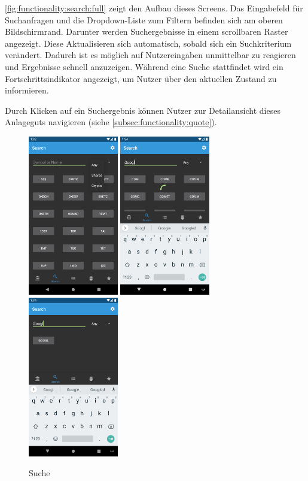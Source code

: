 \documentclass[a4paper]{article}
\begin{document}
\autoref{fig:functionality:search:full} zeigt den Aufbau dieses Screens.
Das Eingabefeld für Suchanfragen und die Dropdown-Liste zum Filtern befinden sich am oberen Bildschirmrand.
Darunter werden Suchergebnisse in einem scrollbaren Raster angezeigt.
Diese Aktualisieren sich automatisch, sobald sich ein Suchkriterium verändert.
Dadurch ist es möglich auf Nutzereingaben unmittelbar zu reagieren und Ergebnisse schnell anzuzeigen.
Während eine Suche stattfindet wird ein Fortschritts\-indikator angezeigt, um Nutzer über den aktuellen Zustand zu informieren.

Durch Klicken auf ein Suchergebnis können Nutzer zur Detailansicht dieses Anlageguts navigieren (siehe \autoref{subsec:functionality:quote}).

\begin{figure}[H]
	\centering
	\includegraphics[height=7cm,keepaspectratio]{./images/search_type.png}
	\includegraphics[height=7cm,keepaspectratio]{./images/search_loading.png}
	\includegraphics[height=7cm,keepaspectratio]{./images/search_done.png}
	\caption{Suche}
	\label{fig:functionality:search:full}
\end{figure}
\end{document}
